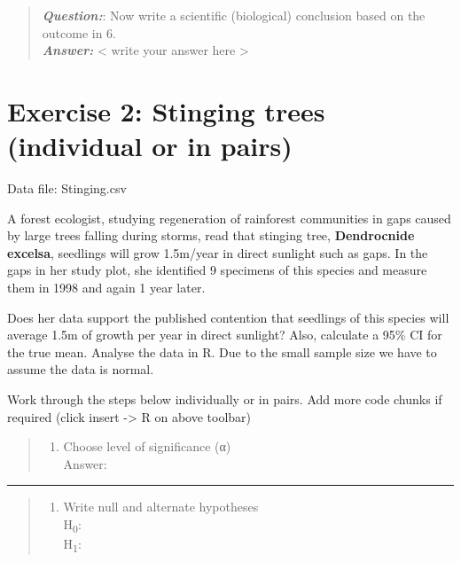 \documentclass[
  10pt,
  letterpaper,
  DIV=11,
  numbers=noendperiod]{scrartcl}
\providecommand{\tightlist}{%
  \setlength{\itemsep}{0pt}\setlength{\parskip}{0pt}}\usepackage{longtable,booktabs,array}
\begin{document}
\begin{quote}
\textbf{\emph{Question:}}: Now write a scientific (biological)
conclusion based on the outcome in 6.\\
\textbf{\emph{Answer:}} \textless{} write your answer here
\textgreater{}
\end{quote}

\hypertarget{exercise-2-stinging-trees-individual-or-in-pairs}{%
\section{Exercise 2: Stinging trees (individual or in
pairs)}\label{exercise-2-stinging-trees-individual-or-in-pairs}}

Data file: Stinging.csv

A forest ecologist, studying regeneration of rainforest communities in
gaps caused by large trees falling during storms, read that stinging
tree, \textbf{Dendrocnide excelsa}, seedlings will grow 1.5m/year in
direct sunlight such as gaps. In the gaps in her study plot, she
identified 9 specimens of this species and measure them in 1998 and
again 1 year later.

Does her data support the published contention that seedlings of this
species will average 1.5m of growth per year in direct sunlight? Also,
calculate a 95\% CI for the true mean. Analyse the data in R. Due to the
small sample size we have to assume the data is normal.

Work through the steps below individually or in pairs. Add more code
chunks if required (click insert -\textgreater{} R on above toolbar)

\begin{quote}
\begin{enumerate}
\def\labelenumi{\arabic{enumi}.}
\tightlist
\item
  Choose level of significance (α)\\
  Answer:
\end{enumerate}
\end{quote}

\begin{center}\rule{0.5\linewidth}{0.5pt}\end{center}

\begin{quote}
\begin{enumerate}
\def\labelenumi{\arabic{enumi}.}
\setcounter{enumi}{1}
\tightlist
\item
  Write null and alternate hypotheses\\
  H\textsubscript{0}:\\
  H\textsubscript{1}:
\end{enumerate}
\end{quote}
\end{document}
